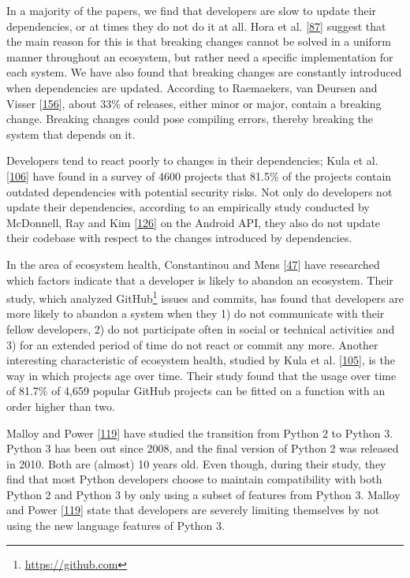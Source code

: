 \documentclass[]{book}
\let\rmarkdownfootnote\footnote%
\def\footnote{\protect\rmarkdownfootnote}
\begin{document}
In a majority of the papers, we find that developers are slow to update
their dependencies, or at times they do not do it at all. Hora et al.
{[}\protect\hyperlink{ref-Hora2016}{87}{]} suggest that the main reason
for this is that breaking changes cannot be solved in a uniform manner
throughout an ecosystem, but rather need a specific implementation for
each system. We have also found that breaking changes are constantly
introduced when dependencies are updated. According to Raemaekers, van
Deursen and Visser {[}\protect\hyperlink{ref-Raemaekers2017}{156}{]},
about 33\% of releases, either minor or major, contain a breaking
change. Breaking changes could pose compiling errors, thereby breaking
the system that depends on it.

Developers tend to react poorly to changes in their dependencies; Kula
et al. {[}\protect\hyperlink{ref-Kula2017}{106}{]} have found in a
survey of 4600 projects that 81.5\% of the projects contain outdated
dependencies with potential security risks. Not only do developers not
update their dependencies, according to an empirically study conducted
by McDonnell, Ray and Kim
{[}\protect\hyperlink{ref-McDonnell2013}{126}{]} on the Android API,
they also do not update their codebase with respect to the changes
introduced by dependencies.

In the area of ecosystem health, Constantinou and Mens
{[}\protect\hyperlink{ref-Constantinou2017}{47}{]} have researched which
factors indicate that a developer is likely to abandon an ecosystem.
Their study, which analyzed GitHub\footnote{\url{https://github.com}}
issues and commits, has found that developers are more likely to abandon
a system when they 1) do not communicate with their fellow developers,
2) do not participate often in social or technical activities and 3) for
an extended period of time do not react or commit any more. Another
interesting characteristic of ecosystem health, studied by Kula et al.
{[}\protect\hyperlink{ref-Kula2017-2}{105}{]}, is the way in which
projects age over time. Their study found that the usage over time of
81.7\% of 4,659 popular GitHub projects can be fitted on a function with
an order higher than two.

Malloy and Power {[}\protect\hyperlink{ref-Malloy2018}{119}{]} have
studied the transition from Python 2 to Python 3. Python 3 has been out
since 2008, and the final version of Python 2 was released in 2010. Both
are (almost) 10 years old. Even though, during their study, they find
that most Python developers choose to maintain compatibility with both
Python 2 and Python 3 by only using a subset of features from Python 3.
Malloy and Power {[}\protect\hyperlink{ref-Malloy2018}{119}{]} state
that developers are severely limiting themselves by not using the new
language features of Python 3.
\end{document}
